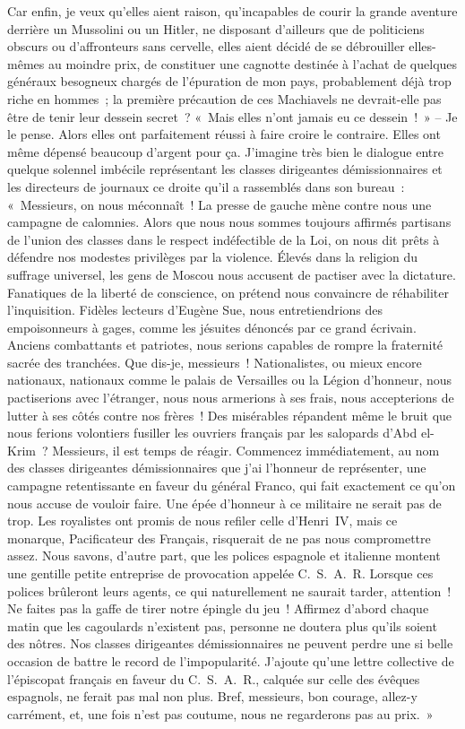 \documentclass[french,twoside]{book} %
\begin{document}
Car enfin, je veux qu’elles aient raison, qu’incapables de courir la grande aventure derrière un Mussolini ou un Hitler, ne disposant d’ailleurs que de politiciens obscurs ou d’affronteurs sans cervelle, elles aient décidé de se débrouiller elles-mêmes au moindre prix, de constituer une cagnotte destinée à l’achat de quelques généraux besogneux chargés de l’épuration de mon pays, probablement déjà trop riche en hommes ; la première précaution de ces Machiavels ne devrait-elle pas être de tenir leur dessein secret ? « Mais elles n’ont jamais eu ce dessein ! » – Je le pense. Alors elles ont parfaitement réussi à faire croire le contraire. Elles ont même dépensé beaucoup d’argent pour ça. J’imagine très bien le dialogue entre quelque solennel imbécile représentant les classes dirigeantes démissionnaires et les directeurs de journaux ce droite qu’il a rassemblés dans son bureau : « Messieurs, on nous méconnaît ! La presse de gauche mène contre nous une campagne de calomnies. Alors que nous nous sommes toujours affirmés partisans de l’union des classes dans le respect indéfectible de la Loi, on nous dit prêts à défendre nos modestes privilèges par la violence. Élevés dans la religion du suffrage universel, les gens de Moscou nous accusent de pactiser avec la dictature. Fanatiques de la liberté de conscience, on prétend nous convaincre de réhabiliter l’inquisition. Fidèles lecteurs d’Eugène Sue, nous entretiendrions des empoisonneurs à gages, comme les jésuites dénoncés par ce grand écrivain. Anciens combattants et patriotes, nous serions capables de rompre la fraternité sacrée des tranchées. Que dis-je, messieurs ! Nationalistes, ou mieux encore nationaux, nationaux comme le palais de Versailles ou la Légion d’honneur, nous pactiserions avec l’étranger, nous nous armerions à ses frais, nous accepterions de lutter à ses côtés contre nos frères ! Des misérables répandent même le bruit que nous ferions volontiers fusiller les ouvriers français par les salopards d’Abd el-Krim ? Messieurs, il est temps de réagir. Commencez immédiatement, au nom des classes dirigeantes démissionnaires que j’ai l’honneur de représenter, une campagne retentissante en faveur du général Franco, qui fait exactement ce qu’on nous accuse de vouloir faire. Une épée d’honneur à ce militaire ne serait pas de trop. Les royalistes ont promis de nous refiler celle d’Henri \textsc{IV}, mais ce monarque, Pacificateur des Français, risquerait de ne pas nous compromettre assez. Nous savons, d’autre part, que les polices espagnole et italienne montent une gentille petite entreprise de provocation appelée C. S. A. R. Lorsque ces polices brûleront leurs agents, ce qui naturellement ne saurait tarder, attention ! Ne faites pas la gaffe de tirer notre épingle du jeu ! Affirmez d’abord chaque matin que les cagoulards n’existent pas, personne ne doutera plus qu’ils soient des nôtres. Nos classes dirigeantes démissionnaires ne peuvent perdre une si belle occasion de battre le record de l’impopularité. J’ajoute qu’une lettre collective de l’épiscopat français en faveur du C. S. A. R., calquée sur celle des évêques espagnols, ne ferait pas mal non plus. Bref, messieurs, bon courage, allez-y carrément, et, une fois n’est pas coutume, nous ne regarderons pas au prix. »\par
\end{document}
